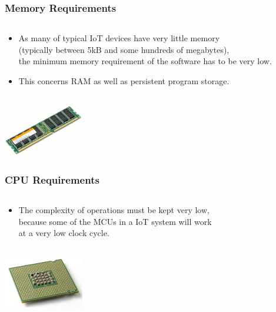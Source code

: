 \documentclass{beamer}
\begin{document}
\begin{frame}
	\frametitle{Memory Requirements}
	\begin{columns}[c]
		\begin{column}{30cm}
			\vspace{.1cm}
			\begin{itemize}
				\justifying
				\item As many of typical IoT devices have very little memory \\
				(typically between 5kB and some hundreds of megabytes),\\
				the minimum memory requirement of the software has to be very low.
				\item This concerns RAM as well as persistent program
				storage.
			\end{itemize}
		\end{column}
	\end{columns}
	\vspace{1cm}
	\hspace*{7cm} \includegraphics[width=3.5cm]{figs/RAM.png}
\end{frame}

\begin{frame}
	\frametitle{CPU Requirements}
	\begin{columns}[c]
		\begin{column}{30cm}
			\vspace{.1cm}
			\begin{itemize}
				\justifying
				\item The complexity of operations must be kept very low,\\
				because some of the MCUs in a IoT system will work\\
				at a very low clock cycle.
			\end{itemize}
		\end{column}
	\end{columns}
	\vspace{1cm}
	\hspace*{7cm} \includegraphics[width=3.5cm]{figs/CPU.jpg}
\end{frame}
\end{document}
